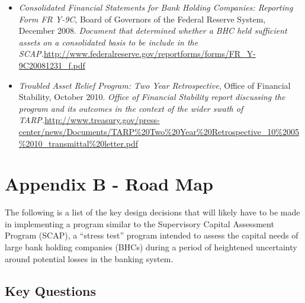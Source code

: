 \documentclass[12pt]{article}
\begin{document}
\begin{itemize}
\item
\emph{Consolidated
  Financial Statements for Bank Holding Companies: Reporting Form FR
  Y-9C}, Board of Governors of the Federal Reserve System, December
  2008. \emph{Document that determined whether a BHC held sufficient
  assets on a consolidated basis to be include in the SCAP.}\url{http://www.federalreserve.gov/reportforms/forms/FR_Y-9C20081231_f.pdf}
\item
\emph{Troubled
  Asset Relief Program: Two Year Retrospective}, Office of Financial
  Stability, October 2010. \emph{Office of Financial Stability report
  discussing the program and its outcomes in the context of the wider
  swath of TARP.}\url{http://www.treasury.gov/press-center/news/Documents/TARP\%20Two\%20Year\%20Retrospective_10\%2005\%2010_transmittal\%20letter.pdf}
\end{itemize}

\section{Appendix B - Road Map}

The following is a list of the key design decisions that will likely have to be made in implementing a program similar to the Supervisory Capital Assessment Program (SCAP), a ``stress test'' program intended to assess the capital needs of large bank holding companies (BHCs) during a period of heightened uncertainty around potential losses in the banking system.

\subsection{Key Questions}
\end{document}
